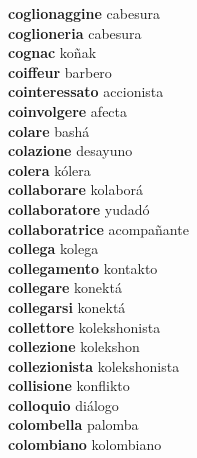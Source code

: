 \textbf{coglionaggine } cabesura \\
\textbf{coglioneria } cabesura \\
\textbf{cognac } koñak \\
\textbf{coiffeur } barbero \\
\textbf{cointeressato } accionista \\
\textbf{coinvolgere } afecta \\
\textbf{colare } bashá \\
\textbf{colazione } desayuno \\
\textbf{colera } kólera \\
\textbf{collaborare } kolaborá \\
\textbf{collaboratore } yudadó \\
\textbf{collaboratrice } acompañante \\
\textbf{collega } kolega \\
\textbf{collegamento } kontakto \\
\textbf{collegare } konektá \\
\textbf{collegarsi } konektá \\
\textbf{collettore } kolekshonista \\
\textbf{collezione } kolekshon \\
\textbf{collezionista } kolekshonista \\
\textbf{collisione } konflikto \\
\textbf{colloquio } diálogo \\
\textbf{colombella } palomba \\
\textbf{colombiano } kolombiano \\
